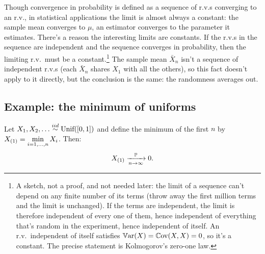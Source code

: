 Though convergence in probability is defined as a sequence of r.v.s converging to an r.v., in statistical applications the limit is almost always a constant: the sample mean converges to $\mu$, an estimator converges to the parameter it estimates.
There's a reason the interesting limits are constants.
If the r.v.s in the sequence are independent and the sequence converges in probability, then the limiting r.v.\ must be a constant.\footnote{A sketch, not a proof, and not needed later: the limit of a sequence can't depend on any finite number of its terms (throw away the first million terms and the limit is unchanged). If the terms are independent, the limit is therefore independent of every one of them, hence independent of everything that's random in the experiment, hence independent of itself. An r.v.\ independent of itself satisfies $\operatorname*{\mathbb{V}\text{ar}}(X) = \operatorname*{\mathbb{C}\text{ov}}(X, X) = 0$, so it's a constant. The precise statement is Kolmogorov's zero-one law.}
The sample mean $\bar{X}_n$ isn't a sequence of independent r.v.s (each $\bar{X}_n$ shares $X_1$ with all the others), so this fact doesn't apply to it directly, but the conclusion is the same: the randomness averages out.

\subsection{Example: the minimum of uniforms}

\begin{example}
\label{ex:min-unif}
Let $X_1, X_2, \ldots \stackrel{iid}{\sim} \text{Unif}([0,1])$ and define the minimum of the first $n$ by $\displaystyle X_{(1)} = \min_{i=1,\ldots,n} X_i$.
Then:
\[
X_{(1)} \xrightarrow [n \to \infty ]{\mathbb{P}} 0.
\]
\end{example}

